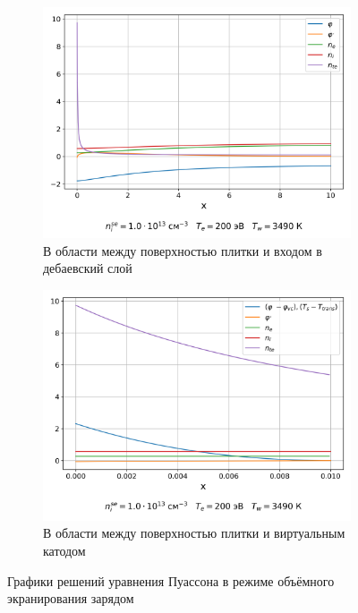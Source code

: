\begin{figure}[H]
	\centering
	\begin{subfigure}{\textwidth}
		\centering
	\includegraphics[width=0.7\linewidth]{material/plot_Te=200eV_nse=1.0e13.png}
    \caption[]{В области между поверхностью плитки и входом в дебаевский слой}
	  \end{subfigure}%
    \hfill
	\begin{subfigure}{\textwidth}
	  \centering
        \includegraphics[width=0.7\linewidth]{material/plot_alpha_Te=200eV_nse=1.0e13.png}
    \caption[]{В области между поверхностью плитки и виртуальным катодом}
	\end{subfigure}%
    \caption[]{Графики решений уравнения Пуассона в режиме объёмного экранирования зарядом}
	\label{pic::Model::results::Poisson_Te-200eV_ne-1e13cm^-3}
\end{figure}
\clearpage
